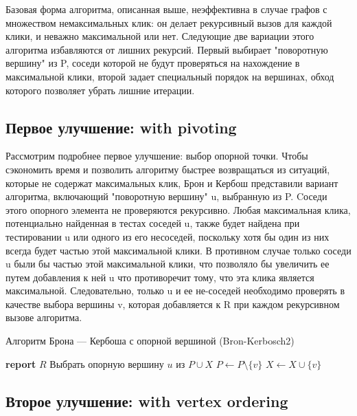 \documentclass{article}
\begin{document}
Базовая форма алгоритма, описанная выше, неэффективна в случае графов с множеством немаксимальных клик: он делает рекурсивный вызов для каждой клики, и неважно максимальной или нет. Следующие две вариации этого алгоритма избавляются от лишних рекурсий. Первый выбирает "поворотную вершину" из P, соседи которой не будут проверяться на нахождение в максимальной клики, второй задает специальный порядок на вершинах, обход которого позволяет убрать лишние итерации.


\subsection{Первое улучшение: with pivoting}
Рассмотрим подробнее первое улучшение: выбор опорной точки. Чтобы сэкономить время и позволить алгоритму быстрее возвращаться из ситуаций, которые не содержат максимальных клик, Брон и Кербош представили \cite{Bron1973} вариант алгоритма, включающий "поворотную вершину" u, выбранную из P. Cоседи этого опорного элемента не проверяются рекурсивно. Любая максимальная клика, потенциально найденная в тестах соседей u, также будет найдена при тестировании u или одного из его несоседей, поскольку хотя бы один из них всегда будет частью этой максимальной клики. В противном случае только соседи u были бы частью этой максимальной клики, что позволяло бы увеличить ее путем добавления к ней u что противоречит тому, что эта клика является максимальной. Следовательно, только u и ее не-соседей необходимо проверять в качестве выбора вершины v, которая добавляется к R при каждом рекурсивном вызове алгоритма.

\begin{algorithm}
\caption{Алгоритм Брона — Кербоша с опорной вершиной (Bron-Kerbosch2)}
\label{alg:bronkerbosch2}
\begin{algorithmic}[1]
        \State \textbf{report} $R$ 
    \EndIf
    \State Выбрать опорную вершину $u$ из $P \cup X$
        \State {}
        \State $P \gets P \setminus \{v\}$
        \State $X \gets X \cup \{v\}$
    \EndFor
\EndProcedure
\end{algorithmic}
\end{algorithm}

\subsection{Второе улучшение: with vertex ordering}
\end{document}
